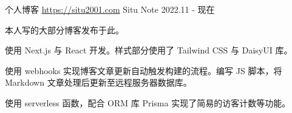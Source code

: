 
\begin{cventries}



\cventry
    {个人博客 \href{https://situ2001.com}{https://situ2001.com}} %
    {Situ Note} %
    {} %
    {2022.11 - 现在} %
    {
    \begin{cvitems} %
        \item {本人写的大部分博客发布于此。}
        \item {使用 Next.js 与 React 开发。样式部分使用了 Tailwind CSS 与 DaisyUI 库。}
        \item {使用 webhooks 实现博客文章更新自动触发构建的流程。编写 JS 脚本，将 Markdown 文章处理后更新至远程服务器数据库。}
        \item {使用 serverless 函数，配合 ORM 库 Prisma 实现了简易的访客计数等功能。}
    \end{cvitems}
    }



\end{cventries}
